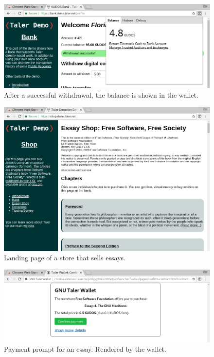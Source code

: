 \begin{figure}
\centering
\includegraphics[width=\textwidth]{taler-screenshots/withdraw-done.png}
\caption{After a successful withdrawal, the balance is shown in the wallet.}
\label{fig:ux:withdraw-done}
\end{figure}

\begin{figure}
\centering
\includegraphics[width=\textwidth]{taler-screenshots/essay-landing.png}
\caption{Landing page of a store that sells essays.}
\label{fig:ux:essay-landing}
\end{figure}

\begin{figure}
\centering
\includegraphics[width=\textwidth]{taler-screenshots/essay-pay.png}
\caption[Payment prompt for an essay.]{Payment prompt for an essay.  Rendered by the wallet.}
\label{fig:ux:essay-pay}
\end{figure}


